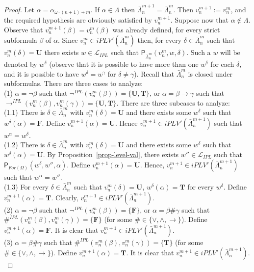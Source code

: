 \documentclass[12pt]{article}
\newcommand{\bT}{\mathbf{T}}
\newcommand{\bU}{\mathbf{U}}
\newcommand{\bF}{\mathbf{F}}
\begin{document}
\begin{proof}
Let $\alpha=\alpha_{\omega\cdot (n+1) +m}$. If $\alpha \in \Lambda$ then $\bar{\Lambda}_n^{m+1}=\bar{\Lambda}_n^m$. Then  $v_n^{m+1}:=v_n^m$, and the required hypothesis are obviously satisfied by $v_n^{m+1}$. Suppose now that  $\alpha \not\in \Lambda$. Observe that $v_n^{m+1}(\beta)=v_n^{m}(\beta)$ was already defined, for every strict subformula $\beta$ of $\alpha$. 
Since $v_n^m \in iPLV'(\bar{\Lambda}_n^m)$ then, for every $\delta \in \bar{\Lambda}_n^m$ such that $v_n^m(\delta)=\bU$ there exists $w   \in \mathcal{L}_{IPL}$ such that $\mathsf{P}_{\bar{\Lambda}_n^m}(v_n^m,w,\delta)$. Such a $w$ will be denoted by $w^\delta$ (observe that it is possible to have more than one $w^\delta$ for each $\delta$, and it is possible to have $w^\delta=w^\gamma$ for $\delta \neq\gamma$). Recall that $\bar{\Lambda}_n^m$ is closed under subformulas.
There are three cases to analyze:\\[1mm]
%
(1) $\alpha=\neg\beta$ such that $\neg^{IPL} (v_n^m(\beta))=\{\bU,\bT\}$, or $\alpha=\beta\to\gamma$ such that $\to^{IPL} (v_n^m(\beta),v_n^m(\gamma))=\{\bU,\bT\}$. There are three subcases to analyze:\\[1mm]
(1.1) There is $\delta \in \bar{\Lambda}_n^m$ with $v_n^m(\delta)=\bU$ and there exists some $w^\delta$ such that $w^\delta(\alpha)=\bF$. Define $v_n^{m+1}(\alpha)=\bU$. Hence $v_n^{m+1} \in iPLV'(\bar{\Lambda}_n^{m+1})$ such that $w^\alpha=w^\delta$.\\[1mm]
(1.2) There is $\delta \in \bar{\Lambda}_n^m $ with $v_n^m(\delta)=\bU$ and there exists some $w^\delta$ such that $w^\delta(\alpha)=\bU$. By Proposition~\ref{prop-level-val}, there exists $w'' \in  \mathcal{L}_{IPL}$ such that $\mathsf{P}_{For(\Omega)}(w^\delta,w'',\alpha)$.  Define $v_n^{m+1}(\alpha)=\bU$. Hence, $v_n^{m+1} \in iPLV'(\bar{\Lambda}_n^{m+1})$ such that $w^\alpha=w''$.\\[1mm]
(1.3) For every $\delta \in \bar{\Lambda}_n^m$ such that $v_n^m(\delta)=\bU$, $w^\delta(\alpha)=\bT$ for every $w^\delta$. Define $v_n^{m+1}(\alpha)=\bT$. Clearly,  $v_n^{m+1} \in iPLV'(\bar{\Lambda}_n^{m+1})$.\\[1mm]
%
(2) $\alpha=\neg\beta$ such that $\neg^{IPL} (v_n^m(\beta))=\{\bF\}$, or $\alpha=\beta\#\gamma$ such that $\#^{IPL} (v_n^m(\beta),v_n^m(\gamma))  =\{\bF\}$ (for some $\# \in \{\vee,\land, \to\}$).  Define $v_n^{m+1}(\alpha)=\bF$. It is clear that $v_n^{m+1} \in iPLV'(\bar{\Lambda}_n^{m+1})$.\\[1mm]
%
(3) $\alpha=\beta\#\gamma$ such that $\#^{IPL} (v_n^m(\beta),v_n^m(\gamma))  =\{\bT\}$ (for some $\# \in \{\vee,\land, \to\}$). Define $v_n^{m+1}(\alpha)=\bT$. It is clear that $v_n^{m+1} \in iPLV'(\bar{\Lambda}_n^{m+1})$.\\[1mm]


\end{proof}
\end{document}
